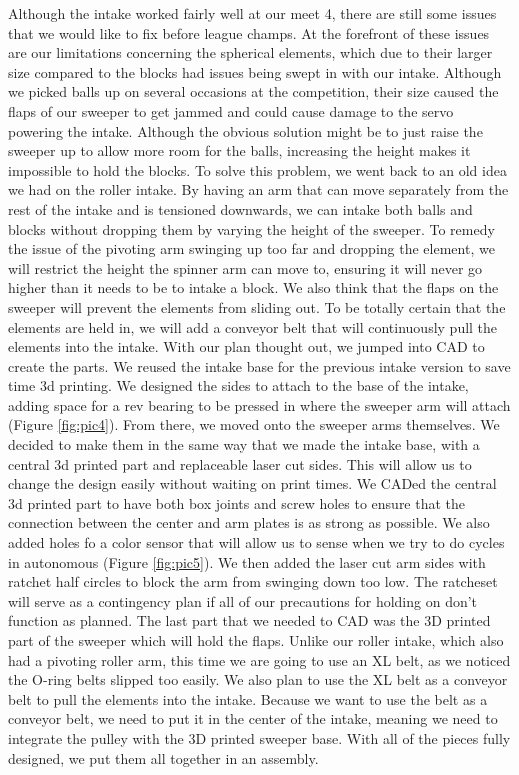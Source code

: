 Although the intake worked fairly well at our meet 4, there are still some issues that we would like to fix before league champs. At the forefront of these issues are our limitations concerning the spherical elements, which due to their larger size compared to the blocks had issues being swept in with our intake. Although we picked balls up on several occasions at the competition, their size caused the flaps of our sweeper to get jammed and could cause damage to the servo powering the intake. Although the obvious solution might be to just raise the sweeper up to allow more room for the balls, increasing the height makes it impossible to hold the blocks. To solve this problem, we went back to an old idea we had on the roller intake. By having an arm that can move separately from the rest of the intake and is tensioned downwards, we can intake both balls and blocks without dropping them by varying the height of the sweeper. To remedy the issue of the pivoting arm swinging up too far and dropping the element, we will restrict the height the spinner arm can move to, ensuring it will never go higher than it needs to be to intake  a block. We also think that the flaps on the sweeper will prevent the elements from sliding out. To be totally certain that the elements are held in, we will add a conveyor belt that will continuously pull the elements into the intake.
With our plan thought out, we jumped into CAD to create the parts. We reused the intake base for the previous intake version to save time 3d printing. We designed the sides to attach to the base of the intake, adding space for a rev bearing to be pressed in where the sweeper arm will attach (Figure \ref{fig:pic4}). From there, we moved onto the sweeper arms themselves. We decided to make them in the same way that we made the intake base, with a central 3d printed part  and replaceable laser cut sides. This will allow us to change the design easily without waiting on print times. We CADed the central 3d printed part to have both box joints and screw holes to ensure that the connection between the center and arm plates is as strong as possible. We also added holes fo a color sensor that will allow us to sense when we try to do cycles in autonomous (Figure \ref{fig:pic5}). We then added the laser cut arm sides with ratchet half circles to block the arm from swinging down too low. The ratcheset will serve as a contingency plan if all of our precautions for holding on don’t function as planned. The last part that we needed to CAD was the 3D printed part of the sweeper which will hold the flaps. Unlike our roller intake, which also had a pivoting roller arm, this time we are going to use an XL belt, as we noticed the O-ring belts slipped too easily. We also plan to use the XL belt as a conveyor belt to pull the elements into the intake. Because we want to use the belt as a conveyor belt, we need to put it in the center of the intake, meaning we need to integrate the pulley with the 3D printed sweeper base. With all of the pieces fully designed, we put them all together in an assembly. 

